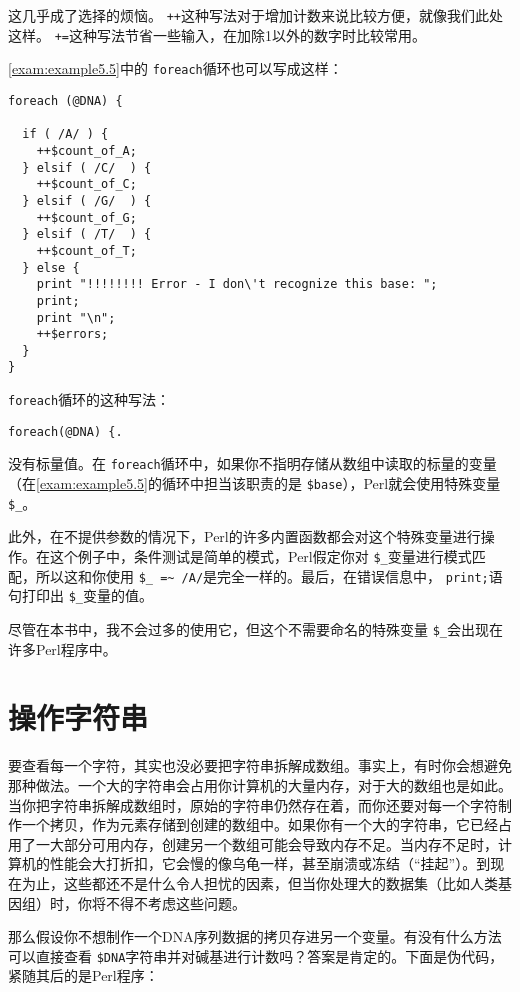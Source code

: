 这几乎成了选择的烦恼。 \verb|++|这种写法对于增加计数来说比较方便，就像我们此处这样。 \verb|+=|这种写法节省一些输入，在加除1以外的数字时比较常用。

\autoref{exam:example5.5}中的 \verb|foreach|循环也可以写成这样：

\begin{lstlisting}
foreach (@DNA) {
  
  if ( /A/ ) {
    ++$count_of_A;
  } elsif ( /C/  ) {
    ++$count_of_C;
  } elsif ( /G/  ) {
    ++$count_of_G;
  } elsif ( /T/  ) {
    ++$count_of_T;
  } else {
    print "!!!!!!!! Error - I don\'t recognize this base: ";
    print;
    print "\n";
    ++$errors;
  }
}
\end{lstlisting}

 \verb|foreach|循环的这种写法：

\begin{lstlisting}
foreach(@DNA) {.
\end{lstlisting}

没有标量值。在 \verb|foreach|循环中，如果你不指明存储从数组中读取的标量的变量（在\autoref{exam:example5.5}的循环中担当该职责的是 \verb|$base|），Perl就会使用特殊变量 \verb|$_|。

此外，在不提供参数的情况下，Perl的许多内置函数都会对这个特殊变量进行操作。在这个例子中，条件测试是简单的模式，Perl假定你对 \verb|$_|变量进行模式匹配，所以这和你使用 \verb|$_ =~ /A/|是完全一样的。最后，在错误信息中， \verb|print;|语句打印出 \verb|$_|变量的值。 

尽管在本书中，我不会过多的使用它，但这个不需要命名的特殊变量 \verb|$_|会出现在许多Perl程序中。

\section{操作字符串}
要查看每一个字符，其实也没必要把字符串拆解成数组。事实上，有时你会想避免那种做法。一个大的字符串会占用你计算机的大量内存，对于大的数组也是如此。当你把字符串拆解成数组时，原始的字符串仍然存在着，而你还要对每一个字符制作一个拷贝，作为元素存储到创建的数组中。如果你有一个大的字符串，它已经占用了一大部分可用内存，创建另一个数组可能会导致内存不足。当内存不足时，计算机的性能会大打折扣，它会慢的像乌龟一样，甚至崩溃或冻结（“挂起”）。到现在为止，这些都还不是什么令人担忧的因素，但当你处理大的数据集（比如人类基因组）时，你将不得不考虑这些问题。

那么假设你不想制作一个DNA序列数据的拷贝存进另一个变量。有没有什么方法可以直接查看 \verb|$DNA|字符串并对碱基进行计数吗？答案是肯定的。下面是伪代码，紧随其后的是Perl程序：

